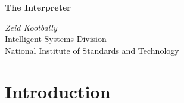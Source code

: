 \documentclass[12pt]{article}
\begin{document}
\begin{titlepage}
\begin{center}

\textbf{The Interpreter}\\

\vspace{1.5cm} %

\textit{Zeid Kootbally}\\
Intelligent Systems Division\\
National Institute of Standards and Technology
                                                                                                                                                             \\

\end{center}
\end{titlepage}
\cleardoublepage

\tableofcontents
\cleardoublepage
{}
\listoffigures
\cleardoublepage
\section{Introduction}
\label{s:interpreter}


% 
\end{document}
